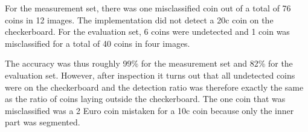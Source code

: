 \documentclass[doc/report.tex]{subfile}
\begin{document}
For the measurement set, there was one misclassified coin out of a total of 76
coins in 12 images. The implementation did not detect a 20c coin on the
checkerboard. For the evaluation set, 6 coins were undetected and 1 coin was
misclassified for a total of 40 coins in four images.

The accuracy was thus roughly 99\% for the measurement set and 82\% for the
evaluation set. However, after inspection it turns out that all undetected
coins were on the checkerboard and the detection ratio was therefore exactly
the same as the ratio of coins laying outside the checkerboard. The one coin
that was misclassified was a 2 Euro coin mistaken for a 10c coin because only
the inner part was segmented.
\end{document}
